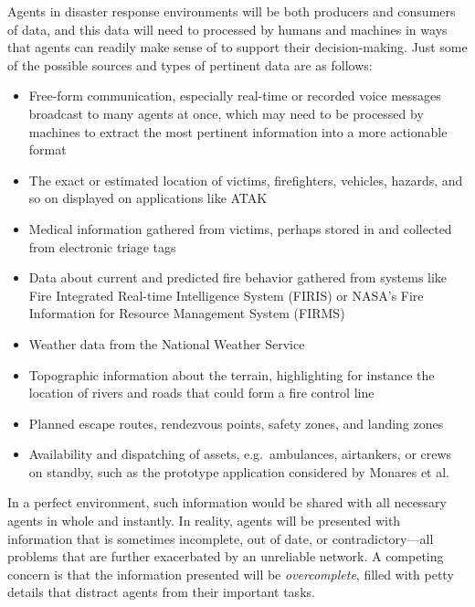 \documentclass[]             %
{NASA}                       %
\theoremstyle{definition}
\begin{document}
Agents in disaster response environments will be both producers and
consumers of data, and this data will need to processed by humans and
machines in ways that agents can readily make sense of to support
their decision-making. Just some of the possible sources and types of
pertinent data are as follows:
\begin{itemize}
\item Free-form communication, especially real-time or recorded voice messages
  broadcast to many agents at once, which may need to be processed by
  machines to extract the most pertinent information into a more
  actionable format
\item The exact or estimated location of victims, firefighters,
  vehicles, hazards, and so on displayed on applications like ATAK
\item Medical information gathered from victims, perhaps stored in and
  collected from electronic triage tags \cite{2009:triagetag}
\item Data about current and predicted fire behavior gathered from
  systems like Fire Integrated Real-time Intelligence System (FIRIS)
  or NASA's Fire Information for Resource Management
  System (FIRMS)
\item Weather data from the National Weather Service
\item Topographic information about the terrain, highlighting for
  instance the location of rivers and roads that could form a fire
  control line
\item Planned escape routes, rendezvous points, safety zones, and
  landing zones
\item Availability and dispatching of assets, e.g.~ambulances,
  airtankers, or crews on standby, such as the prototype application
  considered by Monares et al. \cite{2011:monares}
\end{itemize}
In a perfect environment, such information would be shared with all
necessary agents in whole and instantly. In reality, agents will be
presented with information that is sometimes incomplete, out of date,
or contradictory---all problems that are further exacerbated by an
unreliable network. A competing concern is that the information
presented will be \emph{overcomplete}, filled with petty details that
distract agents from their important tasks.
\end{document}
